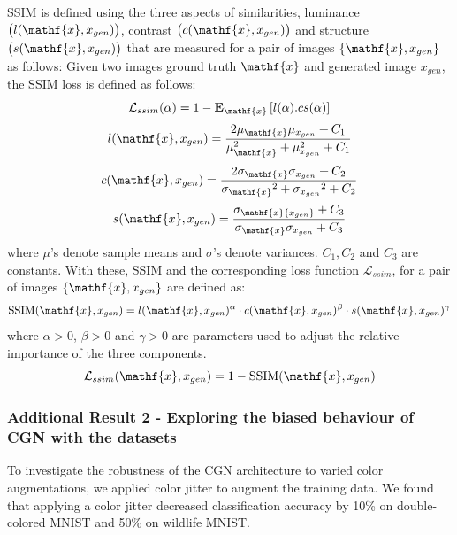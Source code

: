SSIM \cite{wang2004image} is defined using the three aspects of similarities, luminance $\big(l(\mathf{x}, x_{gen})\big)$, contrast $\big(c(\mathf{x}, x_{gen})\big)$ and structure $\big(s(\mathf{x}, x_{gen})\big)$ that are measured for a pair of images $\{\mathf{x}, x_{gen}\}$ as follows:
Given two images ground truth $\mathf{x}$ and generated image $x_{gen}$, the SSIM \cite{wang2004image} loss is defined \cite{pandey2020unsupervised} as follows:
\begin{equation}
\mathcal{L}_{ssim}(\alpha) = 1-\mathbf{E}_\mathf{x}\left[l(\alpha).cs(\alpha)\right]
\label{ssim_loss}
\end{equation}
\begin{equation}
l(\mathf{x}, x_{gen}) = \frac{2\mu_\mathf{x}\mu_{x_{gen}}+C_1}{\mu_\mathf{x}^2+ \mu_{x_{gen}}^2 + C_1}
\end{equation}
\begin{equation}
c(\mathf{x}, x_{gen}) = \frac{2\sigma_{\mathf{x}}\sigma_{x_{gen}}+C_2}{{\sigma_\mathf{x}}^2+ {\sigma_{x_{gen}}}^2 + C_2}
\end{equation}
\begin{equation}
s(\mathf{x}, x_{gen}) = \frac{\sigma_{\mathf{x}{x_{gen}}}+C_3}{\sigma_{\mathf{x}}\sigma_{x_{gen}} + C_3}
\end{equation}
where $\mu$'s denote sample means and $\sigma$'s denote variances. $C_1, C_2$ and $C_3$ are constants. With these, SSIM and the corresponding loss function $\mathcal{L}_{ssim}$, for a pair of images $\{\mathf{x}, x_{gen}\}$ are defined as: 
\begin{equation}
\text{SSIM}(\mathf{x}, x_{gen}) = l(\mathf{x}, x_{gen})^{\alpha} \cdot c(\mathf{x}, x_{gen})^{\beta} \cdot s(\mathf{x}, x_{gen})^{\gamma}  
\end{equation}
where $\alpha>0$, $\beta>0$ and $\gamma>0$ are parameters used to adjust the relative importance of the three components.
\begin{equation}
\mathcal{L}_{ssim}(\mathf{x}, x_{gen}) = 1 - \text{SSIM}(\mathf{x}, x_{gen})
\end{equation}

\subsubsection{Additional Result 2 - Exploring the biased behaviour of CGN\cite{sauer2021counterfactual} with the datasets}


To investigate the robustness of the CGN architecture \cite{sauer2021counterfactual} to varied color augmentations, we applied color jitter to augment the training data. We found that applying a color jitter decreased classification accuracy by 10\% on double-colored MNIST and 50\% on wildlife MNIST.



